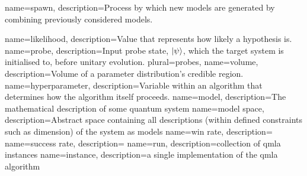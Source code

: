 




{
    name=spawn,
    description={Process by which new models are generated by combining previously considered models.}
}

{
    name=likelihood,
    description={Value that represents how likely a hypothesis is.}
}
{
    name=probe,
    description={Input probe state, $\ket{\psi}$, which the target system is initialised to, before unitary evolution.}
    plural={probes},
}
{
    name=volume,
    description={Volume of a parameter distribution's credible region.}
}
{
    name=hyperparameter,
    description={Variable within an algorithm that determines how the algorithm itself proceeds.}
}
{
    name=model,
    description={The mathematical description of some quantum system}
}
{
    name=model space,
    description={Abstract space containing all descriptions (within defined constraints such as dimension) of the system as models}
}
{
    name=win rate,
    description={}
}
{
    name=success rate,
    description={}
}
{
    name=run,
    description={collection of \gls{qmla} instances}
}
{
    name=instance,
    description={a single implementation of the \gls{qmla} algorithm}
}

